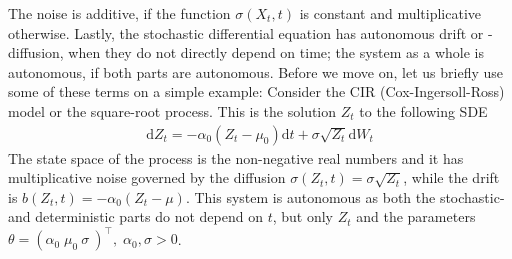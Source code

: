 The noise is additive, if the function $\sigma(X_t, t)$ is constant and multiplicative otherwise. Lastly, the stochastic differential equation has autonomous drift or -diffusion, when they do not directly depend on time; the system as a whole is autonomous, if both parts are autonomous. Before we move on, let us briefly use some of these terms on a simple example: Consider the CIR (Cox-Ingersoll-Ross) model or the square-root process. This is the solution $Z_t$ to the following SDE
\begin{align}
    \mathrm{d}Z_t = -\alpha_0\left(Z_t - \mu_0\right)\mathrm{d}t + \sigma\sqrt{Z_t}\mathrm{d}W_t \label{eq:CIR_process}
\end{align}
The state space of the process is the non-negative real numbers and it has multiplicative noise governed by the diffusion $\sigma\left(Z_t, t\right) = \sigma\sqrt{Z_t}$, while the drift is $b(Z_t, t) = -\alpha_0\left(Z_t - \mu\right)$. This system is autonomous as both the stochastic- and deterministic parts do not depend on $t$, but only $Z_t$ and the parameters  $\theta = \left(\alpha_0\; \mu_0\: \sigma\:\right)^\top,\; \alpha_0, \sigma>0$.

